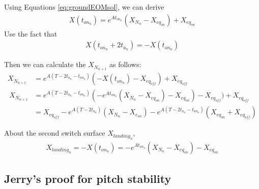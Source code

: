 \noindent Using Equations \ref{eq:groundEOMsol}, we can derive
\begin{align*}
X(t_{on_n} )= e^{At_{on_n}}(X_{N_n} - X_{eq_{on}})+ X_{eq_{on}}
\end{align*}
\noindent Use the fact that 
\begin{align*}
X(t_{on_n}+2t_{a_n}) = -X(t_{on_n} ) 
\end{align*}

\noindent Then we can calculate the $X_{N_{n+1}}$ as follows:
\begin{align}
\nonumber X_{N_{n+1}} &= e^{A(T-2t_{a_n}-t_{on_n})}(-X(t_{on_n} ) - X_{eq_{off}}) + X_{eq_{off}}\\\
\nonumber X_{N_{n+1}} &= e^{A(T-2t_{a_n}-t_{on_n})}(-e^{At_{on_n}}(X_{N_n} - X_{eq_{on}})- X_{eq_{on}} ) - X_{eq_{off}}) + X_{eq_{off}}\\
&= X_{eq_{off}}-e^{A(T-2t_{a_n})}(X_{N_n}-X_{e_{on}}) -e^{A(T-2t_{a_n}-t_{on_n})}( X_{eq_{on}}+ X_{eq_{off}})
\end{align}

About the second switch surface $X_{landing_n}$,
\begin{align}
X_{landing_n} = -X(t_{on_n} ) =- e^{At_{on_n}}(X_{N_n} - X_{eq_{on}})- X_{eq_{on}}
\end{align}

\pagebreak
\subsection{Jerry's proof for pitch stability }

\pagebreak